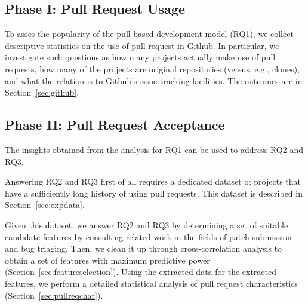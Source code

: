 \documentclass{sig-alternate}
\begin{document}
\subsection{Phase I: Pull Request Usage}

To asses the popularity of the pull-based development model (RQ1), we collect descriptive statistics on the use of pull request in Github. 
In particular, we investigate such questions as how many projects actually make use of
pull requests, how many of the projects are original repositories
(versus, e.g., clones), and what the relation is to Github's issue
tracking facilities. The outcomes are in Section~\ref{sec:github}.

\subsection{Phase II: Pull Request Acceptance}
\label{sec:expprocess}

The insights obtained from the analysis for RQ1 can be used to address
RQ2 and RQ3. 

Answering RQ2 and RQ3 first of all requires a dedicated dataset of
projects that have a sufficiently long history of using pull requests.
This dataset is described in Section~\ref{sec:expdata}.



% 




Given this dataset, we answer RQ2 and RQ3 by determining
a set of suitable candidate
features by consulting related work in the fields of patch submission and bug
triaging. Then, we clean it up through cross-correlation analysis to obtain a
set of features with maximum predictive power
(Section~\ref{sec:featureselection}). Using the extracted data for the 
extracted features, we perform a detailed statistical analysis of pull request
characteristics (Section~\ref{sec:pullreqchar}).
\end{document}
